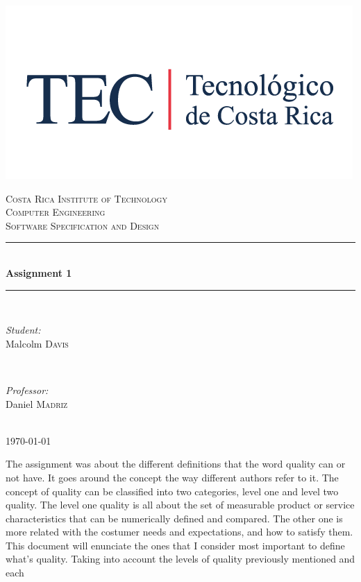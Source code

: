 \documentclass[12pt]{article}
\begin{document}
\begin{titlepage}


\newcommand{\HRule}{\rule{\linewidth}{0.5mm}} 

\center 
 
\includegraphics[width=.9\textwidth]{TEC.png} 

\textsc{\LARGE Costa Rica Institute of Technology}\\[1cm] 
\textsc{\large Computer Engineering }\\[0.5cm] 
\textsc{\large Software Specification and Design}\\[0.5cm] 


\HRule \\[0.4cm]
{ \huge \bfseries Assignment 1}\\[0.3cm] 
\HRule \\[1.5cm]
 

\begin{minipage}{0.4\textwidth}
\begin{flushleft} \large
\emph{Student:}\\
Malcolm  \textsc{Davis} 
\end{flushleft}
\end{minipage}
~
\begin{minipage}{0.4\textwidth}
\begin{flushright} \large
\emph{Professor:} \\
Daniel \textsc{Madriz} 
\end{flushright}
\end{minipage}\\[2cm]

{\large \today}\\[2cm] 

\vfill

\end{titlepage}

\newpage
The assignment was about the different definitions that the word quality can or not have. It goes around the concept the way different authors refer to it.
\newline
The concept of quality can be classified into two categories, level one and level two quality. The level one quality is all about the set of measurable product or service characteristics that can be numerically defined and compared. The other one is more related with the costumer needs and expectations, and how to satisfy them.
\newline
This document will enunciate the ones that I consider most important to define what's quality. Taking into account the levels of quality previously mentioned and each 
\end{document}
